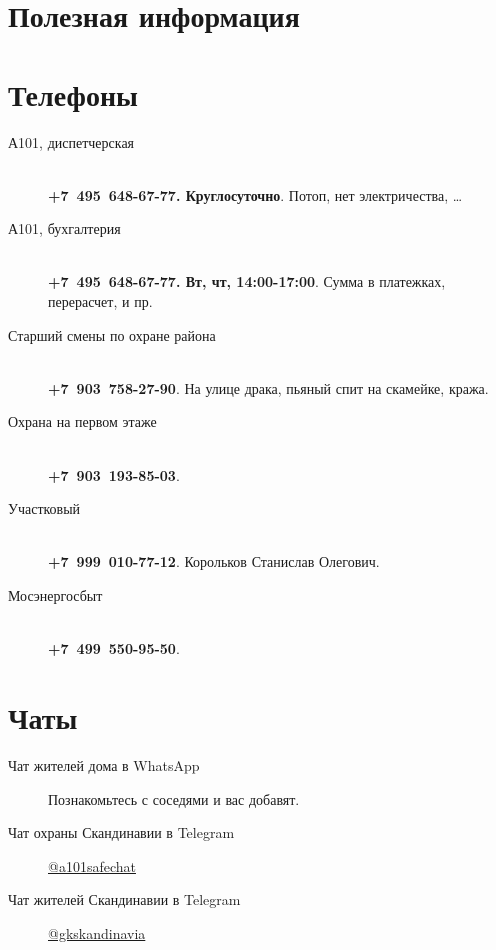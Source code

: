 \documentclass[10pt,landscape,a4paper]{article}
\begin{document}

\section*{Полезная информация\hfill{}}

\noindent\makebox[\linewidth]{\rule{0.9\paperwidth}{0.4pt}}

\small
\begin{multicols*}{3}
  \section*{Телефоны}
  \begin{description}
  \item[А101, диспетчерская]\hfill \\ \textbf{+7~495~648-67-77. Круглосуточно}. Потоп, нет электричества, …
  \item[А101, бухгалтерия]\hfill \\ \textbf{+7~495~648-67-77. Вт, чт, 14:00-17:00}. Сумма в платежках, перерасчет, и пр.
  \item[Старший смены по охране района]\hfill \\ \textbf{+7~903~758-27-90}. На улице драка, пьяный спит на скамейке, кража.
  \item[Охрана на первом этаже]\hfill \\ \textbf{+7~903~193-85-03}.
  \item[Участковый]\hfill \\ \textbf{+7~999~010-77-12}. Корольков Станислав Олегович.
  \item[Мосэнергосбыт]\hfill \\ \textbf{+7~499~550-95-50}.
  \end{description}

  \section*{Чаты}

  \begin{description}
  \item[Чат жителей дома в WhatsApp] Познакомьтесь с соседями и вас добавят.
  \item[Чат охраны Скандинавии в Telegram] \href{https://t.me/a101safechat}{@a101safechat}
  \item[Чат жителей Скандинавии в Telegram] \href{https://t.me/gkskandinavia}{@gkskandinavia}
  \end{description}


\end{multicols*}
\end{document}
